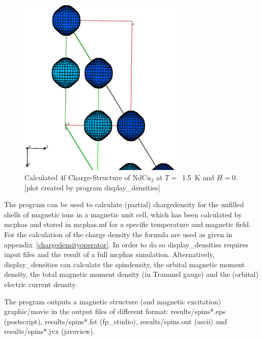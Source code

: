 \begin{figure}[hb]%
\begin{center}\leavevmode
\includegraphics[angle=0, width=0.7\textwidth]{figsrc/ndcu2b/resultss/chargesab.eps}
\end{center}
\caption{Calculated 4f Charge-Structure of NdCu$_2$ at $T=$~1.5~K and $H=0$.
[plot created by program {\prg display\_densities}]}
\label{chargegraphic}
\end{figure}

The program can be used to calculate (partial) chargedensity for the unfilled shells
 of magnetic ions in  a magnetic unit cell, which has been calculated by {\prg mcphas} and
 stored in {\prg mcphas.mf} for a specific temperature and magnetic field.
   For the calculation of the charge density the  formula are used as given in
appendix~\ref{chargedensityoperator}. 
In order to do so {\prg display\_densities}  requires input files and the result of a
full {\prg mcphas} simulation.
Alternatively, {\prg display\_densities}
can  calculate the spindensity, the orbital magnetic moment density, the total magnetic
moment density (in Trammel gauge) and the (orbital) electric current density.

 The program outputs a magnetic structure (and magnetic excitation)
  graphic/movie in the output files of different format:
  results/spins*.eps (postscript), results/spins*.fst (fp\_studio),
  results/spins.out (ascii) and results/spins*.jvx (javaview).

